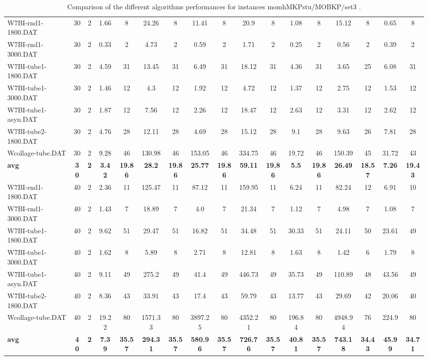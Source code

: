 \begin{table}[!ht]
{\begin{tabular}{lcccccccccccccccc}
W7BI-rnd1-1800.DAT & 30 & 2 & 1.66 & 8 & 24.26 & 8 & 11.41 & 8 & 20.9 & 8 & 1.08 & 8 & 15.12 & 8 & 0.65 & 8 \\
W7BI-rnd1-3000.DAT & 30 & 2 & 0.33 & 2 & 4.73 & 2 & 0.59 & 2 & 1.71 & 2 & 0.25 & 2 & 0.56 & 2 & 0.39 & 2 \\
W7BI-tube1-1800.DAT & 30 & 2 & 4.59 & 31 & 13.45 & 31 & 6.49 & 31 & 18.12 & 31 & 4.36 & 31 & 3.65 & 25 & 6.08 & 31 \\
W7BI-tube1-3000.DAT & 30 & 2 & 1.46 & 12 & 4.3 & 12 & 1.92 & 12 & 4.72 & 12 & 1.37 & 12 & 2.75 & 12 & 1.53 & 12 \\
W7BI-tube1-asyn.DAT & 30 & 2 & 1.87 & 12 & 7.56 & 12 & 2.26 & 12 & 18.47 & 12 & 2.63 & 12 & 3.31 & 12 & 2.62 & 12 \\
W7BI-tube2-1800.DAT & 30 & 2 & 4.76 & 28 & 12.11 & 28 & 4.69 & 28 & 15.12 & 28 & 9.1 & 28 & 9.63 & 26 & 7.81 & 28 \\
Wcollage-tube.DAT & 30 & 2 & 9.28 & 46 & 130.98 & 46 & 153.05 & 46 & 334.75 & 46 & 19.72 & 46 & 150.39 & 45 & 31.72 & 43 \\
\cline{1-17} \textbf{avg} & \textbf{30} & \textbf{2} & \textbf{3.42} & \textbf{19.86} & \textbf{28.2} & \textbf{19.86} & \textbf{25.77} & \textbf{19.86} & \textbf{59.11} & \textbf{19.86} & \textbf{5.5} & \textbf{19.86} & \textbf{26.49} & \textbf{18.57} & \textbf{7.26} & \textbf{19.43} \\ \cline{1-17}
W7BI-rnd1-1800.DAT & 40 & 2 & 2.36 & 11 & 125.47 & 11 & 87.12 & 11 & 159.95 & 11 & 6.24 & 11 & 82.24 & 12 & 6.91 & 10 \\
W7BI-rnd1-3000.DAT & 40 & 2 & 1.43 & 7 & 18.89 & 7 & 4.0 & 7 & 21.34 & 7 & 1.12 & 7 & 4.98 & 7 & 1.08 & 7 \\
W7BI-tube1-1800.DAT & 40 & 2 & 9.62 & 51 & 29.47 & 51 & 16.82 & 51 & 34.48 & 51 & 30.33 & 51 & 24.11 & 50 & 23.61 & 49 \\
W7BI-tube1-3000.DAT & 40 & 2 & 1.62 & 8 & 5.89 & 8 & 2.71 & 8 & 12.81 & 8 & 1.63 & 8 & 1.42 & 6 & 1.79 & 8 \\
W7BI-tube1-asyn.DAT & 40 & 2 & 9.11 & 49 & 275.2 & 49 & 41.4 & 49 & 446.73 & 49 & 35.73 & 49 & 110.89 & 48 & 43.56 & 49 \\
W7BI-tube2-1800.DAT & 40 & 2 & 8.36 & 43 & 33.91 & 43 & 17.4 & 43 & 59.79 & 43 & 13.77 & 43 & 29.69 & 42 & 20.06 & 40 \\
Wcollage-tube.DAT & 40 & 2 & 19.22 & 80 & 1571.33 & 80 & 3897.25 & 80 & 4352.21 & 80 & 196.84 & 80 & 4948.94 & 76 & 224.9 & 80 \\
\cline{1-17} \textbf{avg} & \textbf{40} & \textbf{2} & \textbf{7.39} & \textbf{35.57} & \textbf{294.31} & \textbf{35.57} & \textbf{580.96} & \textbf{35.57} & \textbf{726.76} & \textbf{35.57} & \textbf{40.81} & \textbf{35.57} & \textbf{743.18} & \textbf{34.43} & \textbf{45.99} & \textbf{34.71} \\ \cline{1-17}
\bottomrule
\end{tabular}
}%
\caption{Comparison of the different algorithms performances for instances momhMKPstu/MOBKP/set3 .}
\label{tab:table_compare_momhMKPstu/MOBKP/set3 }
\end{table}

